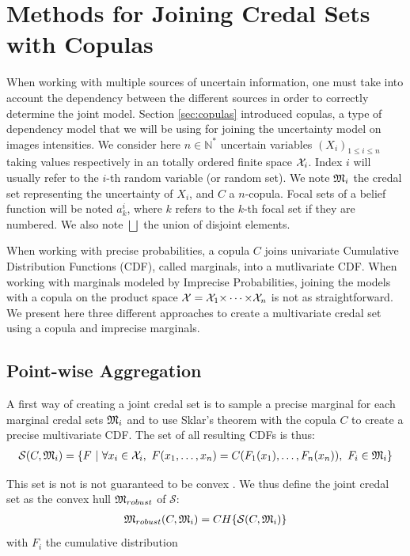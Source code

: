 \section{Methods for Joining Credal Sets with Copulas}
When working with multiple sources of uncertain information, one must take into account the dependency between the different sources in order to correctly determine the joint model. Section \ref{sec:copulas} introduced copulas, a type of dependency model that we will be using for joining the uncertainty model on images intensities. We consider here $n\in\mathbb{N}^*$ uncertain variables $(X_i)_{1\leqslant i\leqslant n}$ taking values respectively in an totally ordered finite space ${\mathcal{X}}_i$. Index $i$ will usually refer to the $i$-th random variable (or random set). We note ${\mathfrak{M}}_i$ the credal set representing the uncertainty of $X_i$, and $C$ a $n$-copula. Focal sets of a belief function will be noted $a^i_k$, where $k$ refers to the $k$-th focal set if they are numbered. We also note $\bigsqcup$ the union of disjoint elements.

When working with precise probabilities, a copula $C$ joins univariate Cumulative Distribution Functions (CDF), called marginals, into a mutlivariate CDF. When working with marginals modeled by Imprecise Probabilities, joining the models with a copula on the product space ${\mathcal{X}}={\mathcal{X}}_1{\times\dots\times}{\mathcal{X}}_n$ is not as straightforward. We present here three different approaches to create a multivariate credal set using a copula and imprecise marginals. 

\subsection{Point-wise Aggregation}\label{sec:robust_method}
A first way of creating a joint credal set is to sample a precise marginal for each marginal credal sets ${\mathfrak{M}}_i$ and to use Sklar's theorem with the copula $C$ to create a precise multivariate CDF. The set of all resulting CDFs is thus:
\begin{eqnarray}\label{eq:robust_ancestor}
    \mathcal{S}(C,{\mathfrak{M}}_i) = \{F~|~\forall x_i \in {\mathcal{X}}_i,~ F(x_1,\dots,x_n) = C(F_1(x_1), \dots, F_n(x_n)),~F_i\in{\mathfrak{M}}_i \}
\end{eqnarray}

This set is not is not guaranteed to be convex \cite{schmelzer_random_2023}. We thus define the joint credal set as the convex hull ${\mathfrak{M}}_{robust}$ of $\mathcal{S}$:
\begin{eqnarray}\label{eq:robust_set}
    {\mathfrak{M}}_{robust}(C,{\mathfrak{M}}_i) = CH\{\mathcal{S}(C,{\mathfrak{M}}_i)\}
\end{eqnarray}
with $F_i$ the cumulative distribution

